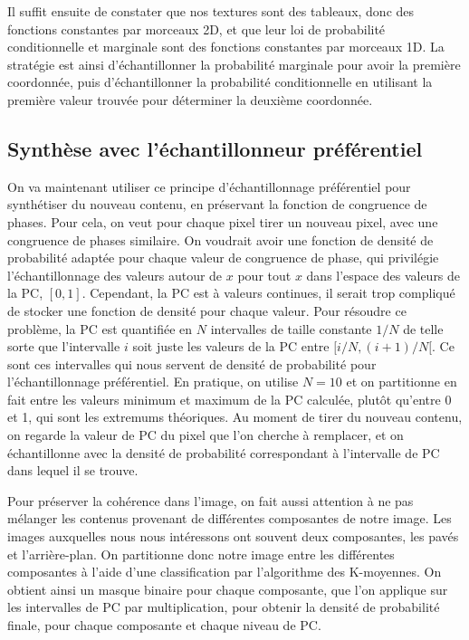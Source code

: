 Il suffit ensuite de constater que nos textures sont des tableaux, donc des fonctions constantes par morceaux 2D, et que leur loi de probabilité conditionnelle et marginale sont des fonctions constantes par morceaux 1D. La stratégie est ainsi d'échantillonner la probabilité marginale pour avoir la première coordonnée, puis d'échantillonner la probabilité conditionnelle en utilisant la première valeur trouvée pour déterminer la deuxième coordonnée.

\subsection{Synthèse avec l'échantillonneur préférentiel}

On va maintenant utiliser ce principe d'échantillonnage préférentiel pour synthétiser du nouveau contenu, en préservant la fonction de congruence de phases. Pour cela, on veut pour chaque pixel tirer un nouveau pixel, avec une congruence de phases similaire. On voudrait avoir une fonction de densité de probabilité adaptée pour chaque valeur de congruence de phase, qui privilégie l'échantillonnage des valeurs autour de $x$ pour tout $x$ dans l'espace des valeurs de la PC, $[0, 1]$. Cependant, la PC est à valeurs continues, il serait trop compliqué de stocker une fonction de densité pour chaque valeur. Pour résoudre ce problème, la PC est quantifiée en $N$ intervalles de taille constante $1/N$ de telle sorte que l'intervalle $i$ soit juste les valeurs de la PC entre $[i/N, (i+1)/N[$. Ce sont ces intervalles qui nous servent de densité de probabilité pour l'échantillonnage préférentiel. En pratique, on utilise $N=10$ et on partitionne en fait entre les valeurs minimum et maximum de la PC calculée, plutôt qu'entre 0 et 1, qui sont les extremums théoriques. Au moment de tirer du nouveau contenu, on regarde la valeur de PC du pixel que l'on cherche à remplacer, et on échantillonne avec la densité de probabilité correspondant à l'intervalle de PC dans lequel il se trouve.

\bigskip

Pour préserver la cohérence dans l'image, on fait aussi attention à ne pas mélanger les contenus provenant de différentes \og composantes \fg de notre image. Les images auxquelles nous nous intéressons ont souvent deux composantes, les pavés et l'arrière-plan. On partitionne donc notre image entre les différentes composantes à l'aide d'une classification par l'algorithme des K-moyennes. On obtient ainsi un masque binaire pour chaque composante, que l'on applique sur les intervalles de PC par multiplication, pour obtenir la densité de probabilité finale, pour chaque composante et chaque niveau de PC.

